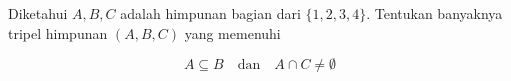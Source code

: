 Diketahui \( A, B, C \) adalah himpunan bagian dari \(\{1, 2, 3, 4\}\). Tentukan banyaknya tripel himpunan \((A, B, C)\) yang memenuhi  

\[
A \subseteq B \quad \text{dan} \quad A \cap C \neq \emptyset
\]